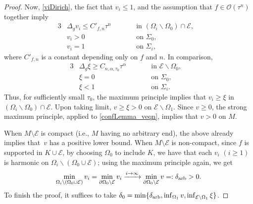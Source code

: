 \documentclass[10pt,a4paper]{amsart}
\numberwithin{equation}{section}
\def\Ecal{\mathcal{E}}
\def\Ocal{\mathcal{O}}
\def\setdiff{\backslash}
\begin{document}
\begin{proof}
Now, \eqref{viDirich}, the fact that $v_i\le 1$, and the assumption that
$f \in \Ocal(\tau^n)$ together imply
\begin{alignat*}{3}
            &\Delta_g v_i \le C'_{f,n} \tau^n\qquad &&\mbox{in } (\Omega_i\setdiff \Omega_0)\cap \Ecal,&\\
            &v_i > 0&&\mbox{on } \Sigma_0,&\\
            &v_i  = 1&&\mbox{on } \Sigma_i,&
\end{alignat*}
where $C'_{f,n}$ is a constant depending only on $f$ and $n$.
In comparison,
\begin{alignat*}{3}
            &\Delta_g\xi  \ge C_{n,\alpha, \tau_0} \tau^\alpha \qquad &&\mbox{in } \Ecal \setdiff \Omega_0,&\\
            &\xi = 0 && \mbox{on } \Sigma_0,&\\
            &\xi < 1 &&\mbox{on }  \Sigma_i.&
        \end{alignat*}
Thus, for sufficiently small $\tau_0$,
the maximum principle implies that $v_i\ge\xi$ in $(\Omega_i \setdiff \Omega_0)\cap \Ecal$.
Upon taking limit, $v\ge \xi >0$ on $\Ecal \setdiff \Omega_1$.
Since $v\ge 0$, the strong maximum principle, applied to \eqref{confLemma_veqn},
implies that $v>0$ on $M$.

When  $M\setminus \Ecal$ is compact (i.e., $M$ having no arbitrary end),
the above already implies that~$v$ has a positive lower bound.
When $M\setminus \Ecal$ is non-compact,
since $f$ is supported in $K\cup \Ecal$, by choosing $\Omega_0$ to include $K$, we have that each $v_i$ $(i\ge 1)$ is harmonic on $\Omega_i \setdiff(\Omega_0\cup \Ecal)$; using the maximum principle again, we get
\begin{equation*}
    \min_{\Omega_i \setdiff(\Omega_0\cup \Ecal)} v_i = \min_{\partial \Omega_0\setminus \Ecal} v_i
    \xrightarrow{i\rightarrow\infty} \min_{\partial\Omega_0\setminus\Ecal} v =: \delta_{\rm arb} >0.
\end{equation*}
To finish the proof, it suffices to take $\delta_0 = \min\{ \delta_{\rm arb} , \inf_{\Omega_1}v, \inf_{\Ecal\setminus\Omega_1}\xi\}$.
\end{proof}
\end{document}

